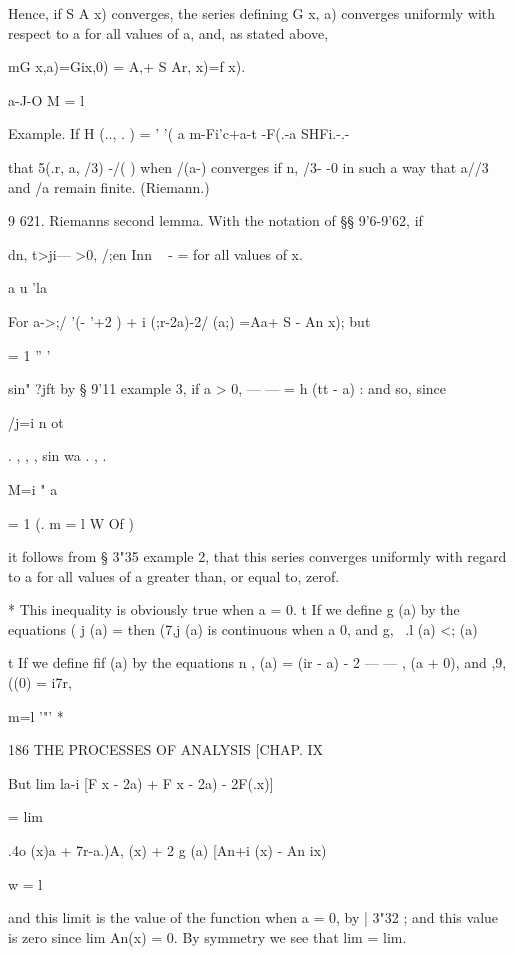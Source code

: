 Hence, if S A x) converges, the series defining G x, a) converges
uniformly with respect to a for all values of a, and, as stated above,
\ \ {mG x,a)=Gix,0) = A,+ S Ar, x)=f x).

a-J-O M = l

Example. If H (.., . ) = ' '( a m-Fi'c+a-t -F(.-a SHFi.-.-

that 5(.r, a, /3) -/( ) when /(a-) converges if n, /3- -0 in such a
way that a//3 and /a remain finite. (Riemann.)

9 621. Riemanns second lemma. With the notation of §§ 9'6-9'62, if

dn, t>ji— >0, /;en Inn ~ - = for all values of x.

a u 'la

For a->;/ '(- '+2 ) + i (;r-2a)-2/ (a;) =Aa+ S - An x); but

  = 1 '' '

  sin" ?jft by § 9'11 example 3, if a > 0, — — = h (tt - a) : and so,
since

/j=i n ot

. , , , sin wa . , .

M=i " a

  = 1 (. m = l W Of )

it follows from § 3"35 example 2, that this series converges uniformly
with regard to a for all values of a greater than, or equal to, zerof.



* This inequality is obviously true when a = 0. t If we define g (a)
by the equations ( j (a) = then (7,j (a) is continuous when a 0, and
g, \ .l (a) <; (a)



t If we define fif (a) by the equations n , (a) = (ir - a) - 2 — — ,
(a + 0), and ,9,((0) = i7r,

m=l '"' *



186 THE PROCESSES OF ANALYSIS [CHAP. IX

But lim la-i [F x - 2a) + F x - 2a) - 2F(.x)]



= lim



.4o (x)a + 7r-a.)A, (x) + 2 g (a) [An+i (x) - An ix)



w = l



and this limit is the value of the function when a = 0, by | 3"32 ;
and this value is zero since lim An(x) = 0. By symmetry we see that
lim = lim.

}
